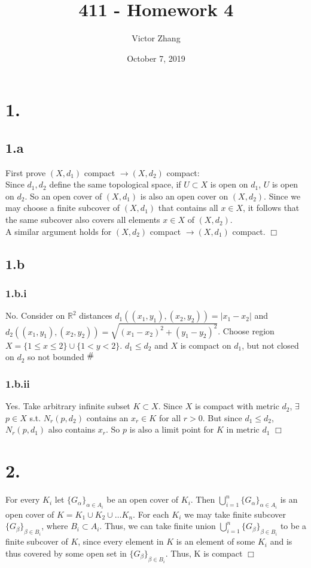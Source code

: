 \documentclass{article}
\title{411 - Homework 4}
\author{Victor Zhang}
\date{October 7, 2019}
\newcommand{\contra}{\raisebox{\depth}{\#}}
\begin{document}
\maketitle

\section *{1.}
\subsection*{1.a}

First prove $(X,d_1)$ compact $\rightarrow (X,d_2)$ compact:\\
Since $d_1, d_2$ define the same topological space, if $U\subset X$ is open on $d_1$, $U$ is open on $d_2$. So an open cover of $(X,d_1)$ is also an open cover on $(X,d_2)$. Since we may choose a finite subcover of $(X,d_1)$ that contains all $x \in X$, it follows that the same subcover also covers all elements $x \in X$ of $(X,d_2)$.\\
A similar argument holds for $(X,d_2)$ compact $\rightarrow (X,d_1)$ compact. $\Box$

\subsection*{1.b}
\subsubsection*{1.b.i}
No. Consider on $\mathbb{R}^2$ distances $d_1((x_1,y_1),(x_2,y_2)) = |x_1-x_2|$ and\\
$d_2((x_1,y_1),(x_2,y_2)) = \sqrt{(x_1-x_2)^2 + (y_1-y_2)^2}$. Choose region $X = \{1\leq x\leq 2\}\cup \{1<y<2\}$. $d_1 \leq d_2$ and $X$ is compact on $d_1$, but not closed on $d_2$ so not bounded $\contra$

\subsubsection*{1.b.ii}
Yes. Take arbitrary infinite subset $K \subset X$. Since $X$ is compact with metric $d_2$, $\exists$ $p \in X$ s.t. $N_r (p,d_2)$ contains an $x_r \in K$ for all $r>0$. But since $d_1 \leq d_2$, $N_r (p,d_1)$ also contains $x_r$. So $p$ is also a limit point for $K$ in metric $d_1$ $\Box$

\section*{2.}
For every $K_i$ let ${\{G_\alpha\}}_{\alpha \in A_i}$ be an open cover of $K_i$.
Then $\bigcup_{i=1}^n {\{G_\alpha\}}_{\alpha \in A_i}$ is an open cover of $K = K_1 \cup K_2 \cup \ldots K_n$.
For each $K_i$ we may take finite subcover ${\{G_\beta\}}_{\beta \in B_i}$, where $B_i \subset A_i$. Thus, we can take finite union $\bigcup_{i=1}^n {\{G_\beta\}}_{\beta \in B_i}$ to be a finite subcover of $K$, since every element in $K$ is an element of some $K_i$ and is thus covered by some open set in ${\{G_\beta\}}_{\beta \in B_i}$. Thus, K is compact $\Box$
\end{document}
